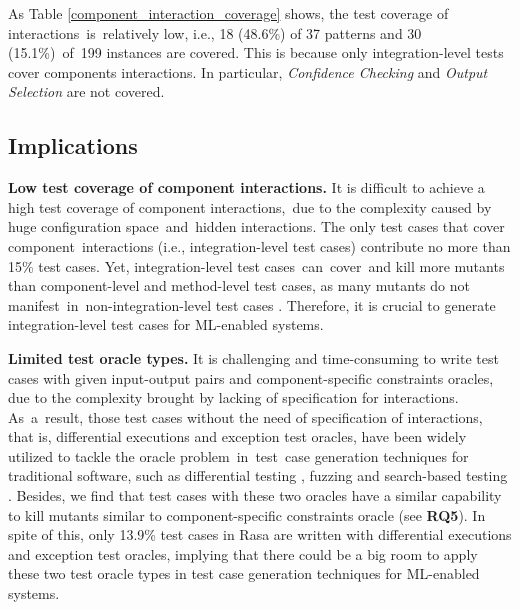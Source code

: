         As Table \ref{component_interaction_coverage} shows, the test coverage of interactions~is~relatively low, i.e., 18 (48.6\%) of 37 patterns and 30 (15.1\%)~of~199 instances are covered. This is because only integration-level tests cover components interactions.
        In particular, \textit{Confidence Checking} and \textit{Output Selection} are not covered.
        
        \subsection{Implications} 
        
        \textbf{Low test coverage of component interactions.} It is difficult to achieve a high test coverage of component interactions,~due to the complexity caused by huge configuration space~and~hidden interactions. The only test cases that cover component~interactions (i.e., integration-level test cases) contribute no more than 15\% test cases.
        Yet, integration-level test cases~can~cover~and kill more mutants than component-level and method-level test cases, as many mutants do not manifest~in~non-integration-level test cases \cite{integration_test}.
        Therefore, it is crucial to generate integration-level test cases for ML-enabled systems.
        
        
        \textbf{Limited test oracle types.} 
        It is challenging and time-consuming to write test cases with given input-output pairs and component-specific constraints oracles, due to the complexity brought by lacking of specification for interactions. 
        As~a~result, those test cases without the need of specification of interactions, that is, differential executions and exception test oracles, have been widely utilized to tackle the oracle problem~in~test~case generation techniques for traditional software, such as differential testing \cite{evans2007differential}, fuzzing \cite{liang2018fuzzing} and search-based testing \cite{mcminn2011search}.
        Besides, we find that test cases with these two oracles have a similar capability to kill mutants similar to component-specific constraints oracle (see \textbf{RQ5}). In spite of this, only 13.9\% test cases in Rasa are written with differential executions and exception test oracles, implying that there could be a big room to apply these two test oracle types in test case generation techniques for ML-enabled systems.

